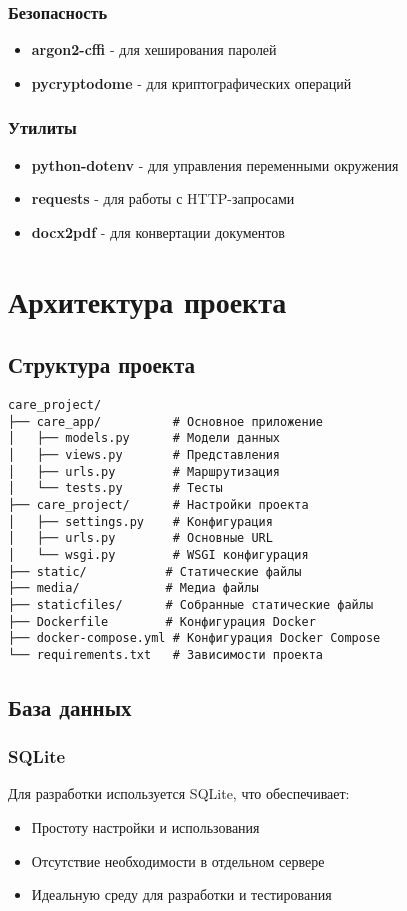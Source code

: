 \documentclass[12pt,a4paper]{article}
\begin{document}
\subsubsection{Безопасность}
\begin{itemize}
    \item \textbf{argon2-cffi} - для хеширования паролей
    \item \textbf{pycryptodome} - для криптографических операций
\end{itemize}

\subsubsection{Утилиты}
\begin{itemize}
    \item \textbf{python-dotenv} - для управления переменными окружения
    \item \textbf{requests} - для работы с HTTP-запросами
    \item \textbf{docx2pdf} - для конвертации документов
\end{itemize}

\section{Архитектура проекта}
\subsection{Структура проекта}
\begin{verbatim}
care_project/
├── care_app/          # Основное приложение
│   ├── models.py      # Модели данных
│   ├── views.py       # Представления
│   ├── urls.py        # Маршрутизация
│   └── tests.py       # Тесты
├── care_project/      # Настройки проекта
│   ├── settings.py    # Конфигурация
│   ├── urls.py        # Основные URL
│   └── wsgi.py        # WSGI конфигурация
├── static/           # Статические файлы
├── media/            # Медиа файлы
├── staticfiles/      # Собранные статические файлы
├── Dockerfile        # Конфигурация Docker
├── docker-compose.yml # Конфигурация Docker Compose
└── requirements.txt   # Зависимости проекта
\end{verbatim}

\subsection{База данных}
\subsubsection{SQLite}
Для разработки используется SQLite, что обеспечивает:
\begin{itemize}
    \item Простоту настройки и использования
    \item Отсутствие необходимости в отдельном сервере
    \item Идеальную среду для разработки и тестирования
\end{itemize}
\end{document}
